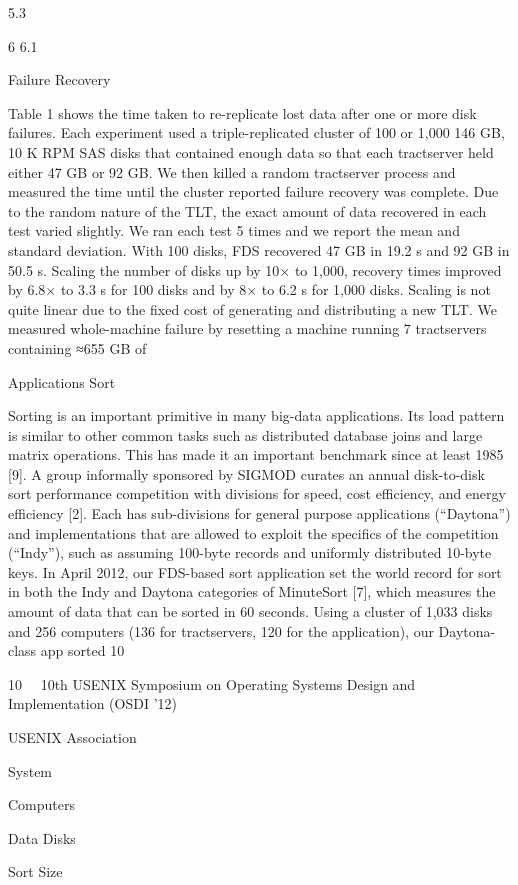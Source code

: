 5.3

6
6.1

Failure Recovery

Table 1 shows the time taken to re-replicate lost data
after one or more disk failures. Each experiment used
a triple-replicated cluster of 100 or 1,000 146 GB, 10 K
RPM SAS disks that contained enough data so that each
tractserver held either 47 GB or 92 GB. We then killed a
random tractserver process and measured the time until
the cluster reported failure recovery was complete. Due
to the random nature of the TLT, the exact amount of data
recovered in each test varied slightly. We ran each test 5
times and we report the mean and standard deviation.
With 100 disks, FDS recovered 47 GB in 19.2 s and
92 GB in 50.5 s. Scaling the number of disks up by 10×
to 1,000, recovery times improved by 6.8× to 3.3 s for
100 disks and by 8× to 6.2 s for 1,000 disks. Scaling is
not quite linear due to the fixed cost of generating and
distributing a new TLT.
We measured whole-machine failure by resetting a
machine running 7 tractservers containing ≈655 GB of

Applications
Sort

Sorting is an important primitive in many big-data applications. Its load pattern is similar to other common
tasks such as distributed database joins and large matrix
operations. This has made it an important benchmark
since at least 1985 [9]. A group informally sponsored
by SIGMOD curates an annual disk-to-disk sort performance competition with divisions for speed, cost efficiency, and energy efficiency [2]. Each has sub-divisions
for general purpose applications (“Daytona”) and implementations that are allowed to exploit the specifics of the
competition (“Indy”), such as assuming 100-byte records
and uniformly distributed 10-byte keys.
In April 2012, our FDS-based sort application set the
world record for sort in both the Indy and Daytona categories of MinuteSort [7], which measures the amount
of data that can be sorted in 60 seconds. Using a cluster
of 1,033 disks and 256 computers (136 for tractservers,
120 for the application), our Daytona-class app sorted
10

10  10th USENIX Symposium on Operating Systems Design and Implementation (OSDI ’12) 

USENIX Association


System

Computers

Data Disks

Sort Size

